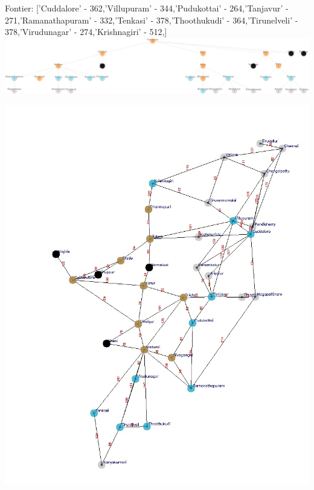 \documentclass[xcolor=table]{beamer}
\begin{document}
\begin{frame}
  { \tiny Fontier: ['Cuddalore' - 362,'Villupuram' - 344,'Pudukottai' - 264,'Tanjavur' - 271,'Ramanathapuram' - 332,'Tenkasi' - 378,'Thoothukudi' - 364,'Tirunelveli' - 378,'Virudunagar' - 274,'Krishnagiri' - 512,]}
  \includegraphics[width=1\textwidth]{../UCSNodes/19-1.png}
  \begin{center}
    \includegraphics[height=0.55\textheight]{../UCSoutput/tamilUCS17.jpg}
  \end{center}
\end{frame}
\end{document}
